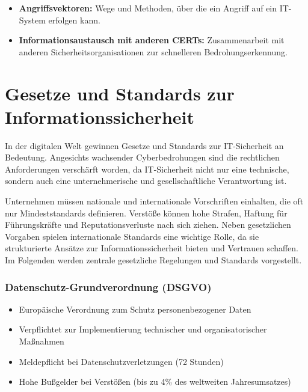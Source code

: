 \documentclass{orgstandard}
\begin{document}
\begin{NOTES}
\begin{itemize}
\item \textbf{Angriffsvektoren:} Wege und Methoden, über die ein Angriff auf ein IT-System erfolgen kann.
\item \textbf{Informationsaustausch mit anderen CERTs:} Zusammenarbeit mit anderen Sicherheitsorganisationen zur schnelleren Bedrohungserkennung.
\end{itemize}
\end{NOTES}
\section{Gesetze und Standards zur Informationssicherheit}
\label{sec:org8026ccf}

In der digitalen Welt gewinnen Gesetze und Standards zur IT-Sicherheit an Bedeutung. Angesichts wachsender Cyberbedrohungen sind die rechtlichen Anforderungen verschärft worden, da IT-Sicherheit nicht nur eine technische, sondern auch eine unternehmerische und gesellschaftliche Verantwortung ist.

\begin{NOTES}
Unternehmen müssen nationale und internationale Vorschriften einhalten, die oft nur Mindeststandards definieren. Verstöße können hohe Strafen, Haftung für Führungskräfte und Reputationsverluste nach sich ziehen. Neben gesetzlichen Vorgaben spielen internationale Standards eine wichtige Rolle, da sie strukturierte Ansätze zur Informationssicherheit bieten und Vertrauen schaffen. Im Folgenden werden zentrale gesetzliche Regelungen und Standards vorgestellt.
\end{NOTES}
\subsubsection{Datenschutz-Grundverordnung (DSGVO)}
\label{sec:org1915fd9}
\begin{itemize}
\item Europäische Verordnung zum Schutz personenbezogener Daten
\item Verpflichtet zur Implementierung technischer und organisatorischer Maßnahmen
\item Meldepflicht bei Datenschutzverletzungen (72 Stunden)
\item Hohe Bußgelder bei Verstößen (bis zu 4\% des weltweiten Jahresumsatzes)
\end{itemize}
\end{document}
